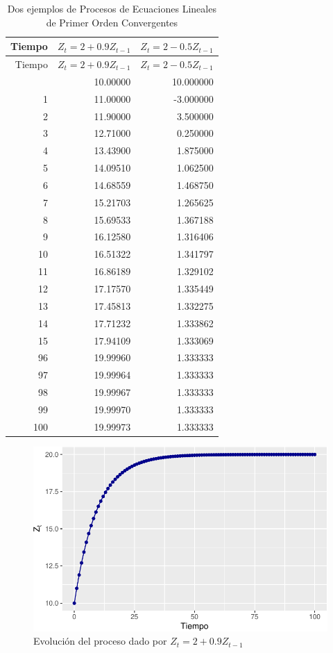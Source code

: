 \documentclass[
  a4paper,
]{article}
\begin{document}
\begin{longtable}[]{@{}rrr@{}}
\caption{Dos ejemplos de Procesos de Ecuaciones Lineales de Primer Orden
Convergentes}\tabularnewline
\toprule\noalign{}
Tiempo & \(Z_t =2+0.9Z_{t-1}\) & \(Z_t = 2-0.5Z_{t-1}\) \\
\midrule\noalign{}
\endfirsthead
\toprule\noalign{}
Tiempo & \(Z_t =2+0.9Z_{t-1}\) & \(Z_t = 2-0.5Z_{t-1}\) \\
\midrule\noalign{}
\endhead
\bottomrule\noalign{}
\endlastfoot
0 & 10.00000 & 10.000000 \\
1 & 11.00000 & -3.000000 \\
2 & 11.90000 & 3.500000 \\
3 & 12.71000 & 0.250000 \\
4 & 13.43900 & 1.875000 \\
5 & 14.09510 & 1.062500 \\
6 & 14.68559 & 1.468750 \\
7 & 15.21703 & 1.265625 \\
8 & 15.69533 & 1.367188 \\
9 & 16.12580 & 1.316406 \\
10 & 16.51322 & 1.341797 \\
11 & 16.86189 & 1.329102 \\
12 & 17.17570 & 1.335449 \\
13 & 17.45813 & 1.332275 \\
14 & 17.71232 & 1.333862 \\
15 & 17.94109 & 1.333069 \\
96 & 19.99960 & 1.333333 \\
97 & 19.99964 & 1.333333 \\
98 & 19.99967 & 1.333333 \\
99 & 19.99970 & 1.333333 \\
100 & 19.99973 & 1.333333 \\
\end{longtable}

\begin{figure}

\caption{Evolución del proceso dado por \(Z_t =2+0.9Z_{t-1}\)}

{\centering \includegraphics{index_files/figure-pdf/fig21-1.pdf}

}

\end{figure}
\end{document}
